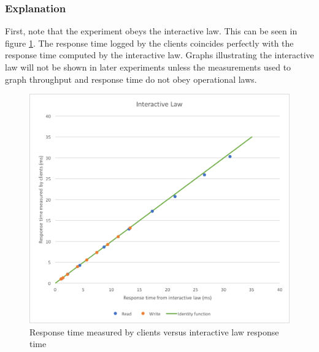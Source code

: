 \documentclass[11pt,a4paper]{article}
\begin{document}
\subsubsection{Explanation\label{section::computation_reads}}
First, note that the experiment obeys the interactive law. This can be seen in figure \ref{png::bench_memcached_inter_law}. The response time logged by the clients coincides perfectly with the response time computed by the interactive law. Graphs illustrating the interactive law will not be shown in later experiments unless the measurements used to graph throughput and response time do not obey operational laws.
\begin{figure}[!h]
    \centering
    \begin{minipage}[b]{.45\textwidth}
        \centering
        \includegraphics[width=\textwidth]{processing/graphics/bench_memcached_inter_law.png}
        \caption{Response time measured by clients versus interactive law response time}
        \label{png::bench_memcached_inter_law}
    \end{minipage}
    \qquad
    \begin{minipage}[b]{.45\textwidth}
        \centering

\end{minipage}
\end{figure}
\end{document}

